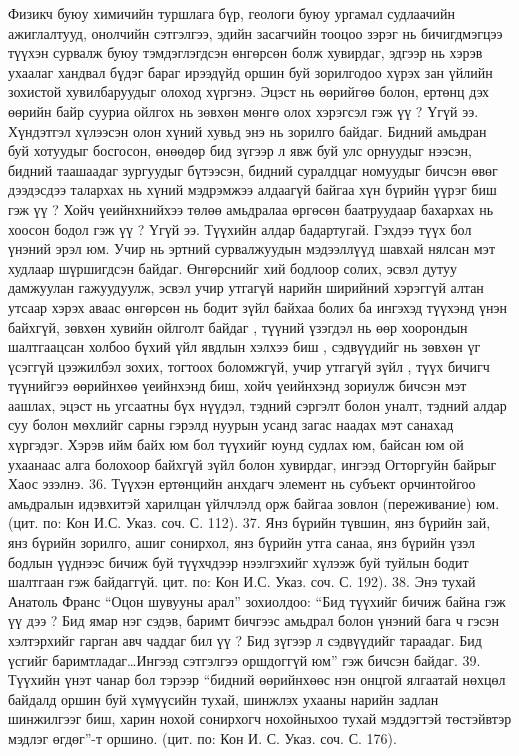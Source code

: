 Физикч буюу химичийн туршлага бүр, геологи буюу ургамал судлаачийн ажиглалтууд, онолчийн сэтгэлгээ, эдийн засагчийн тооцоо зэрэг нь бичигдмэгцээ түүхэн сурвалж буюу тэмдэглэгдсэн өнгөрсөн болж хувирдаг, эдгээр нь хэрэв ухаалаг хандвал бүдэг бараг ирээдүйд оршин буй зорилгодоо хүрэх зан үйлийн зохистой хувилбаруудыг олоход хүргэнэ.
Эцэст нь өөрийгөө болон, ертөнц дэх өөрийн байр сууриа ойлгох нь зөвхөн мөнгө олох хэрэгсэл гэж үү ? Үгүй ээ. Хүндэтгэл хүлээсэн олон хүний хувьд энэ нь зорилго байдаг. Бидний амьдран буй хотуудыг босгосон, өнөөдөр бид зүгээр л явж буй улс орнуудыг нээсэн, бидний таашаадаг зургуудыг бүтээсэн, бидний суралдцаг номуудыг бичсэн өвөг дээдэсдээ талархах нь хүний мэдрэмжээ алдаагүй байгаа хүн бүрийн үүрэг биш гэж үү ? Хойч үеийнхнийхээ төлөө амьдралаа өргөсөн баатруудаар бахархах нь хоосон бодол гэж үү ? Үгүй ээ. Түүхийн алдар бадартугай.
Гэхдээ түүх бол үнэний эрэл юм. Учир нь эртний сурвалжуудын мэдээллүүд шавхай нялсан мэт худлаар шүршигдсэн байдаг. Өнгөрснийг хий бодлоор солих, эсвэл дутуу дамжуулан гажуудуулж, эсвэл учир утгагүй нарийн ширийний хэрэггүй алтан утсаар хэрэх аваас өнгөрсөн нь бодит зүйл байхаа болих ба ингэхэд түүхэнд үнэн байхгүй, зөвхөн хувийн ойлголт байдаг , түүний үзэгдэл нь өөр хоорондын шалтгаацсан холбоо бүхий үйл явдлын хэлхээ биш , сэдвүүдийг нь зөвхөн үг үсэггүй цээжилбэл зохих, тогтоох боломжгүй, учир утгагүй зүйл , түүх бичигч түүнийгээ өөрийнхөө үеийнхэнд биш, хойч үеийнхэнд зориулж бичсэн мэт аашлах, эцэст нь угсаатны бүх нүүдэл, тэдний сэргэлт болон уналт, тэдний алдар суу болон мөхлийг сарны гэрэлд нуурын усанд загас наадах мэт санахад хүргэдэг. Хэрэв ийм байх юм бол түүхийг юунд судлах юм, байсан юм ой ухаанаас алга болохоор байхгүй зүйл болон хувирдаг, ингээд Огторгуйн байрыг Хаос эзэлнэ.
36. Түүхэн ертөнцийн анхдагч элемент нь субъект орчинтойгоо амьдралын идэвхитэй харилцан үйлчлэлд орж байгаа зовлон (переживание) юм. (цит. по: Кон И.С. Указ. соч. С. 112).
37. Янз бүрийн түвшин, янз бүрийн зай, янз бүрийн зорилго, ашиг сонирхол, янз бүрийн утга санаа, янз бүрийн үзэл бодлын үүднээс бичиж буй түүхчдээр нээлгэхийг хүлээж буй туйлын бодит шалтгаан гэж байдаггүй. цит. по: Кон И.С. Указ. соч. С. 192).
38. Энэ тухай Анатоль Франс “Оцон шувууны арал” зохиолдоо: “Бид түүхийг бичиж байна гэж үү дээ ? Бид ямар нэг сэдэв, баримт бичгээс амьдрал болон үнэний бага ч гэсэн хэлтэрхийг гарган авч чаддаг бил үү ? Бид зүгээр л сэдвүүдийг тараадаг. Бид үсгийг баримтладаг…Ингээд сэтгэлгээ оршдоггүй юм” гэж бичсэн байдаг.
39. Түүхийн үнэт чанар бол тэрээр “бидний өөрийнхөөс нэн онцгой ялгаатай нөхцөл байдалд оршин буй хүмүүсийн тухай, шинжлэх ухааны нарийн задлан шинжилгээг биш, харин нохой сонирхогч нохойныхоо тухай мэддэгтэй төстэйвтэр мэдлэг өгдөг”-т оршино. (цит. по: Кон И. С. Указ. соч. С. 176).
